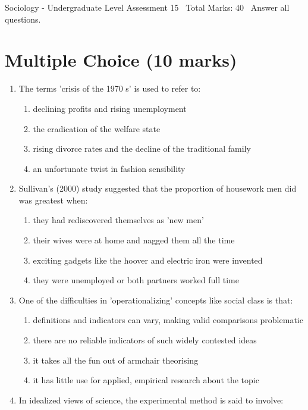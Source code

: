 \documentclass[12pt]{article}
\begin{document}
\begin{center}
Sociology - Undergraduate Level Assessment 15 \
Total Marks: 40 \
Answer all questions.
\end{center}

\section*{Multiple Choice (10 marks)}
\begin{enumerate}[label=\arabic*.]
\item The terms 'crisis of the 1970 s' is used to refer to:
\begin{enumerate}[label=(\alph*)]
    \item declining profits and rising unemployment
    \item the eradication of the welfare state
    \item rising divorce rates and the decline of the traditional family
    \item an unfortunate twist in fashion sensibility
\end{enumerate}
\item Sullivan's (2000) study suggested that the proportion of housework men did was greatest when:
\begin{enumerate}[label=(\alph*)]
    \item they had rediscovered themselves as 'new men'
    \item their wives were at home and nagged them all the time
    \item exciting gadgets like the hoover and electric iron were invented
    \item they were unemployed or both partners worked full time
\end{enumerate}
\item One of the difficulties in 'operationalizing' concepts like social class is that:
\begin{enumerate}[label=(\alph*)]
    \item definitions and indicators can vary, making valid comparisons problematic
    \item there are no reliable indicators of such widely contested ideas
    \item it takes all the fun out of armchair theorising
    \item it has little use for applied, empirical research about the topic
\end{enumerate}
\item In idealized views of science, the experimental method is said to involve:

\end{enumerate}
\end{document}
